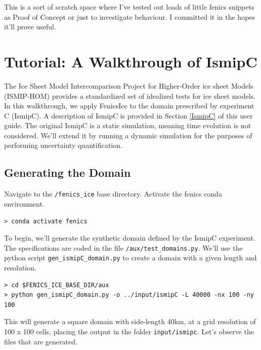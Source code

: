 \documentclass[11pt, reqno, nocenter]{article}
\begin{document}
This is a sort of scratch space where I've tested out loads of little fenics snippets as Proof of Concept or just to investigate behaviour. I committed it in the hopes it'll prove useful.

\section{Tutorial: A Walkthrough of IsmipC}

The Ice Sheet Model Intercomparison Project for Higher-Order ice sheet Models (ISMIP-HOM) provides a standardized set of idealized tests for ice sheet models. In this walkthrough, we apply FenicsIce to the domain prescribed by experiment C (IsmipC). A description of IsmipC is provided in Section \ref{IsmipC} of this user guide. The original IsmipC is a static simulation, meaning time evolution is not considered. We'll extend it by running a dynamic simulation for the purposes of performing uncertainty quantification.


\subsection{Generating the Domain}

Navigate to the {\tt /fenics\_ice} base directory. Activate the fenics conda environment.

\begin{verbatim}
> conda activate fenics 
\end{verbatim}

To begin, we'll generate the synthetic domain defined by the IsmipC experiment. The specifications are coded in the file {\tt /aux/test\_domains.py}. We'll use the python script {\tt gen\_ismipC\_domain.py} to create a domain with a given length and resolution.

\begin{verbatim}
> cd $FENICS_ICE_BASE_DIR/aux 
> python gen_ismipC_domain.py -o ../input/ismipC -L 40000 -nx 100 -ny 100 
\end{verbatim}

This will generate a square domain with side-length 40\si{\kilo\metre}, at a grid resolution of 100 x 100 cells, placing the output in the folder {\tt input/ismipc}.
Let's observe the files that are generated.

\end{document}
